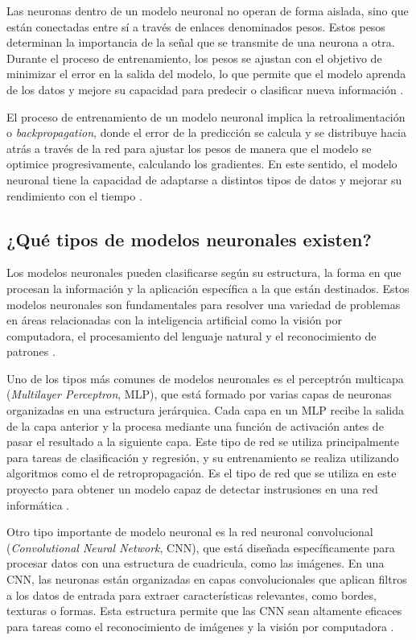 Las neuronas dentro de un modelo neuronal no operan de forma aislada, sino que están conectadas entre sí a través de enlaces denominados pesos. Estos pesos determinan la importancia de la señal que se transmite de una neurona a otra. Durante el proceso de entrenamiento, los pesos se ajustan con el objetivo de minimizar el error en la salida del modelo, lo que permite que el modelo aprenda de los datos y mejore su capacidad para predecir o clasificar nueva información \cite{haykin2009neural}.

El proceso de entrenamiento de un modelo neuronal implica la retroalimentación o \textit{backpropagation}, donde el error de la predicción se calcula y se distribuye hacia atrás a través de la red para ajustar los pesos de manera que el modelo se optimice progresivamente, calculando los gradientes. En este sentido, el modelo neuronal tiene la capacidad de adaptarse a distintos tipos de datos y mejorar su rendimiento con el tiempo \cite{nielsen2015neural}.


\subsection{¿Qué tipos de modelos neuronales existen?}

Los modelos neuronales pueden clasificarse según su estructura, la forma en que procesan la información y la aplicación específica a la que están destinados. Estos modelos neuronales son fundamentales para resolver una variedad de problemas en áreas relacionadas con la inteligencia artificial como la visión por computadora, el procesamiento del lenguaje natural y el reconocimiento de patrones \cite{bishop2006pattern}.

Uno de los tipos más comunes de modelos neuronales es el perceptrón multicapa (\textit{Multilayer Perceptron}, MLP), que está formado por varias capas de neuronas organizadas en una estructura jerárquica. Cada capa en un MLP recibe la salida de la capa anterior y la procesa mediante una función de activación antes de pasar el resultado a la siguiente capa. Este tipo de red se utiliza principalmente para tareas de clasificación y regresión, y su entrenamiento se realiza utilizando algoritmos como el de retropropagación. Es el tipo de red que se utiliza en este proyecto para obtener un modelo capaz de detectar instrusiones en una red informática \cite{goodfellow2016deep}.

Otro tipo importante de modelo neuronal es la red neuronal convolucional (\textit{Convolutional Neural Network}, CNN), que está diseñada específicamente para procesar datos con una estructura de cuadricula, como las imágenes. En una CNN, las neuronas están organizadas en capas convolucionales que aplican filtros a los datos de entrada para extraer características relevantes, como bordes, texturas o formas. Esta estructura permite que las CNN sean altamente eficaces para tareas como el reconocimiento de imágenes y la visión por computadora \cite{goodfellow2016deep}.


